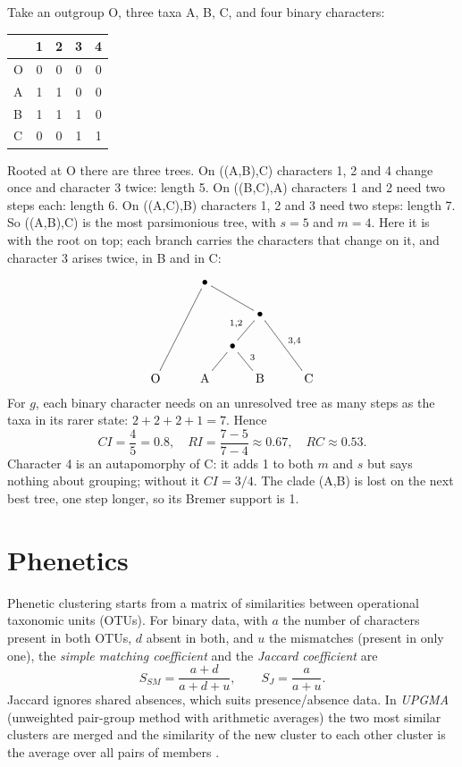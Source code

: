 \begin{example}
\label{example-parsimony}
Take an outgroup O, three taxa A, B, C,
and four binary characters:
\begin{center}
\begin{tabular}{lcccc}
 & 1 & 2 & 3 & 4 \\
\hline
O & 0 & 0 & 0 & 0 \\
A & 1 & 1 & 0 & 0 \\
B & 1 & 1 & 1 & 0 \\
C & 0 & 0 & 1 & 1
\end{tabular}
\end{center}
Rooted at O there are three trees. On
((A,B),C) characters 1, 2 and 4 change
once and character 3 twice: length 5. On
((B,C),A) characters 1 and 2 need two
steps each: length 6. On ((A,C),B)
characters 1, 2 and 3 need two steps:
length 7. So ((A,B),C) is the most
parsimonious tree, with $s = 5$ and
$m = 4$. Here it is with the root on top;
each branch carries the characters that
change on it, and character 3 arises
twice, in B and in C:
$$
\xymatrix@C=1em@R=1.5em{
& & \bullet \ar@{-}[dddll]
\ar@{-}[drr] & & & & \\
& & & & \bullet \ar@{-}[dl]_{1,2}
\ar@{-}[ddrr]^{3,4} & & \\
& & & \bullet \ar@{-}[dl]
\ar@{-}[dr]^{3} & & & \\
\mathrm{O} & & \mathrm{A} & & \mathrm{B} & &
\mathrm{C}
}
$$
For $g$, each binary character
needs on an unresolved tree as many steps
as the taxa in its rarer state:
$2+2+2+1 = 7$.
Hence
$$
CI = \frac{4}{5} = 0.8, \quad
RI = \frac{7-5}{7-4} \approx 0.67, \quad
RC \approx 0.53.
$$
Character 4 is an autapomorphy of C: it
adds 1 to both $m$ and $s$ but says
nothing about grouping; without it
$CI = 3/4$. The clade (A,B) is lost on
the next best tree, one step longer, so
its Bremer support is 1.
\end{example}

\section{Phenetics}
\label{section-phenetics}

Phenetic clustering starts from a matrix
of similarities between operational
taxonomic units (OTUs). For binary data,
with $a$ the number of characters present
in both OTUs, $d$ absent in both, and $u$
the mismatches (present in only one), the
\emph{simple matching coefficient} and the
\emph{Jaccard coefficient} are
$$
S_{SM} = \frac{a+d}{a+d+u}, \qquad
S_J = \frac{a}{a+u}.
$$
Jaccard ignores shared absences, which
suits presence/absence data. In
\emph{UPGMA} (unweighted pair-group method
with arithmetic averages) the two most
similar clusters are merged and the
similarity of the new cluster to each
other cluster is the average over all
pairs of members
\cite[Chapter 8]{singh2010plant}.

